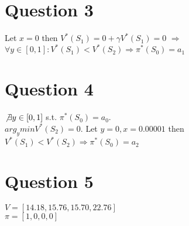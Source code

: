 \documentclass[12pt]{article}
\begin{document}
\section*{Question 3}
Let $x=0$ then $V^{*}(S_1) = 0 + \gamma V^{*}(S_1) = 0$ $\Rightarrow$ $\forall y \in [0,1] : V^{*}(S_1) < V^{*}(S_2) \Rightarrow \pi^{*}(S_0) = a_1$
\section*{Question 4}
$\not \exists y \in [0,1]$ s.t. $\pi^{*}(S_0) = a_0$.\\
$arg_y min V^{*}(S_2) = 0$. Let $y=0, x=0.00001$ then $V^{*}(S_1) < V^{*}(S_2) \Rightarrow \pi^{*}(S_0) = a_2$ 
\section*{Question 5}
$V = [14.18, 15.76, 15.70, 22.76]$\\
$\pi = [1, 0, 0, 0]$
\end{document}
